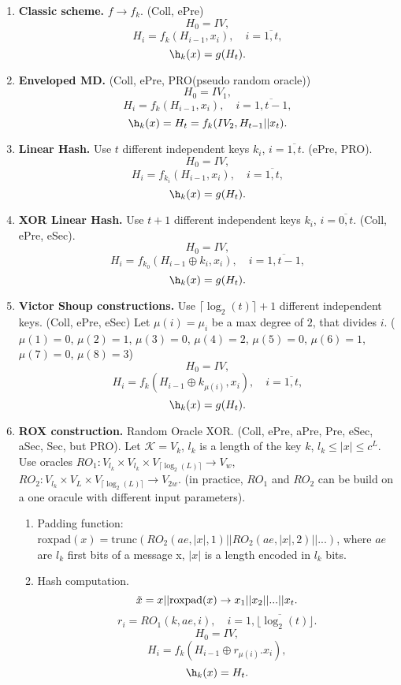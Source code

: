 \begin{enumerate}
    \item \textbf{Classic scheme.} $f \rightarrow f_k$. (Coll, ePre)
        $$H_0 = IV,$$
        $$H_i = f_k(H_{i-1}, x_i), \quad i = \overline{1, t},$$
        $$\h_k(x) = g(H_t).$$
    \item \textbf{Enveloped MD.} (Coll, ePre, PRO(pseudo random oracle))
        $$H_0 = IV_1,$$
        $$H_i = f_k(H_{i-1}, x_i), \quad i = \overline{1, t-1},$$
        $$\h_k(x) = H_t = f_k(IV_2, H_{t-1} || x_t).$$
    \item \textbf{Linear Hash.} Use $t$ different independent keys $k_i$,
        $i = \overline{1, t}$. (ePre, PRO).
        $$H_0 = IV,$$
        $$H_i = f_{k_i}(H_{i-1}, x_i), \quad i = \overline{1, t},$$
        $$\h_k(x) = g(H_t).$$
    \item \textbf{XOR Linear Hash.} Use $t+1$ different independent keys $k_i$,
        $i = \overline{0, t}$. (Coll, ePre, eSec).
        $$H_0 = IV,$$
        $$H_i = f_{k_0}(H_{i-1} \oplus k_i, x_i), \quad i = \overline{1, t-1},$$
        $$\h_k(x) = g(H_t).$$
    \item \textbf{Victor Shoup constructions.} Use $\lceil \log_2(t) \rceil + 1$ different independent
        keys. (Coll, ePre, eSec)
        Let $\mu(i) = \mu_i$ be a max degree of $2$, that divides $i$.
        ($\mu(1) = 0$, $\mu(2) = 1$, $\mu(3) = 0$, $\mu(4) = 2$,
        $\mu(5) = 0$, $\mu(6) = 1$, $\mu(7) = 0$, $\mu(8) = 3$)
        $$H_0 = IV,$$
        $$H_i = f_k(H_{i-1} \oplus k_{\mu(i)}, x_i), \quad i = \overline{1, t},$$
        $$\h_k(x) = g(H_t).$$
    \item \textbf{ROX construction.} Random Oracle XOR.
        (Coll, ePre, aPre, Pre, eSec, aSec, Sec, but PRO).
        Let $\mathcal{K} = V_k$, $l_k$ is a length of the key $k$,
        $l_k \leqslant |x| \leqslant c^{L}$. Use oracles
        $RO_1: V_{l_k} \times V_{l_k} \times V_{\lceil\log_2(L)\rceil} \rightarrow V_w$,
        $RO_2: V_{l_k} \times V_{L} \times V_{\lceil\log_2(L)\rceil} \rightarrow V_{2w}$.
        (in practice, $RO_1$ and $RO_2$ can be build on a one oracule with different input parameters).
        \begin{enumerate}
            \item Padding function:
                $\mathrm{roxpad}(x) = \mathrm{trunc}(RO_2(ae, |x|, 1) || RO_2(ae, |x|, 2) || ...)$,
                where $ae$ are $l_k$ first bits of a message x, $|x|$ is a length encoded in $l_k$ bits.
            \item Hash computation.
                $$\Tilde{x} = x || \mathrm{roxpad}(x) \rightarrow x_1 || x_2 || ... || x_t.$$
                $$r_i = RO_1(k, ae, i), \quad i = \overline{1, \lfloor\log_2(t)\rfloor}.$$
                $$H_0 = IV,$$
                $$H_i = f_k(H_{i-1} \oplus r_{\mu(i)}. x_i),$$
                $$\h_k(x) = H_t.$$
        \end{enumerate}
        
\end{enumerate}

